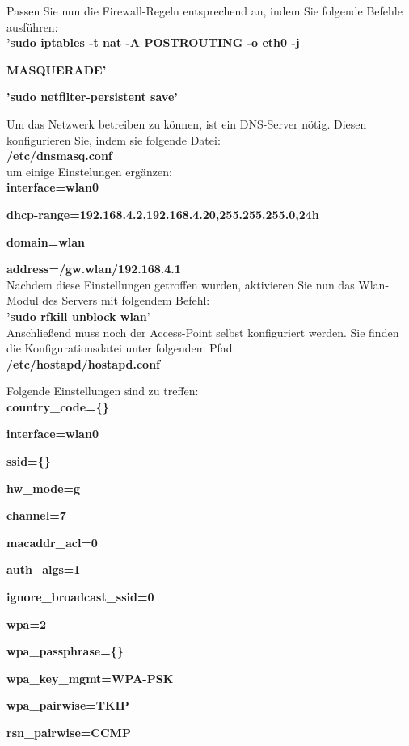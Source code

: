 \noindent Passen Sie nun die Firewall-Regeln entsprechend an, indem Sie folgende Befehle ausführen:\\

\textbf{’sudo iptables -t nat -A POSTROUTING -o eth0 -j}\par \textbf{MASQUERADE’}\par
\textbf{’sudo netfilter-persistent save’}\\

\newpage

\noindent Um das Netzwerk betreiben zu können, ist ein DNS-Server nötig. Diesen konfigurieren Sie, indem sie folgende Datei:\\

\textbf{/etc/dnsmasq.conf}\\

\noindent um einige Einstelungen ergänzen:\\

\textbf{interface=wlan0}\par
\textbf{dhcp-range=192.168.4.2,192.168.4.20,255.255.255.0,24h}\par
\textbf{domain=wlan}\par
\textbf{address=/gw.wlan/192.168.4.1}\\

\noindent Nachdem diese Einstellungen getroffen wurden, aktivieren Sie nun das Wlan-Modul des Servers mit folgendem Befehl:\\

\textbf{’sudo rfkill unblock wlan}’\\

\noindent Anschließend muss noch der Access-Point selbst konfiguriert werden. Sie finden die Konfigurationsdatei unter folgendem Pfad:\\

\textbf{/etc/hostapd/hostapd.conf}

\noindent Folgende Einstellungen sind zu treffen:\\

\textbf{country\_code=\{\}}\par
\textbf{interface=wlan0}\par
\textbf{ssid=\{\}}\par
\textbf{hw\_mode=g}\par
\textbf{channel=7}\par
\textbf{macaddr\_acl=0}\par
\textbf{auth\_algs=1}\par
\textbf{ignore\_broadcast\_ssid=0}\par
\textbf{wpa=2}\par
\textbf{wpa\_passphrase=\{\}}\par
\textbf{wpa\_key\_mgmt=WPA-PSK}\par
\textbf{wpa\_pairwise=TKIP}\par
\textbf{rsn\glqq\_pairwise=CCMP}\\


